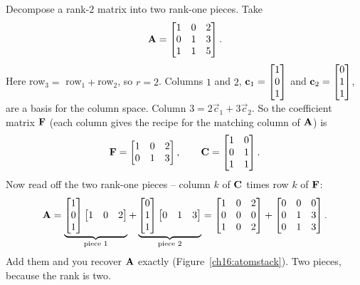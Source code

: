 \begin{example}\label{ch16:sum-numeric}
Decompose a rank-$2$ matrix into two rank-one pieces. Take
\[
  \mathbf{A} = \begin{bmatrix} 1 & 0 & 2 \\ 0 & 1 & 3 \\ 1 & 1 & 5 \end{bmatrix}.
\]
Here row$_3 = $ row$_1 + $row$_2$, so $r=2$. Columns $1$ and $2$,
$\mathbf{c}_1=\begin{bmatrix}1\\0\\1\end{bmatrix}$ and $\mathbf{c}_2=\begin{bmatrix}0\\1\\1\end{bmatrix}$, are a basis for the
column space. Column $3 = 2\vec{c}_1 + 3\vec{c}_2$. So the coefficient matrix
$\mathbf{F}$ (each column gives the recipe for the matching column of $\mathbf{A}$) is
\[
  \mathbf{F} = \begin{bmatrix} 1 & 0 & 2 \\ 0 & 1 & 3 \end{bmatrix},
  \qquad
  \mathbf{C} = \begin{bmatrix} 1 & 0 \\ 0 & 1 \\ 1 & 1 \end{bmatrix}.
\]
Now read off the two rank-one pieces -- column $k$ of $\mathbf{C}$ times row $k$ of
$\mathbf{F}$:
\[
  \mathbf{A}
  = \underbrace{\begin{bmatrix}1\\0\\1\end{bmatrix}\begin{bmatrix}1 & 0 & 2\end{bmatrix}}_{\text{piece }1}
  + \underbrace{\begin{bmatrix}0\\1\\1\end{bmatrix}\begin{bmatrix}0 & 1 & 3\end{bmatrix}}_{\text{piece }2}
  = \begin{bmatrix} 1 & 0 & 2 \\ 0 & 0 & 0 \\ 1 & 0 & 2 \end{bmatrix}
  + \begin{bmatrix} 0 & 0 & 0 \\ 0 & 1 & 3 \\ 0 & 1 & 3 \end{bmatrix}.
\]
Add them and you recover $\mathbf{A}$ exactly (Figure~\ref{ch16:atomstack}). Two
pieces, because the rank is two.
\end{example}

